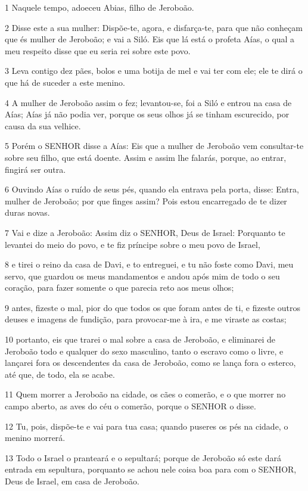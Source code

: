 \par 1 Naquele tempo, adoeceu Abias, filho de Jeroboão.
\par 2 Disse este a sua mulher: Dispõe-te, agora, e disfarça-te, para que não conheçam que és mulher de Jeroboão; e vai a Siló. Eis que lá está o profeta Aías, o qual a meu respeito disse que eu seria rei sobre este povo.
\par 3 Leva contigo dez pães, bolos e uma botija de mel e vai ter com ele; ele te dirá o que há de suceder a este menino.
\par 4 A mulher de Jeroboão assim o fez; levantou-se, foi a Siló e entrou na casa de Aías; Aías já não podia ver, porque os seus olhos já se tinham escurecido, por causa da sua velhice.
\par 5 Porém o SENHOR disse a Aías: Eis que a mulher de Jeroboão vem consultar-te sobre seu filho, que está doente. Assim e assim lhe falarás, porque, ao entrar, fingirá ser outra.
\par 6 Ouvindo Aías o ruído de seus pés, quando ela entrava pela porta, disse: Entra, mulher de Jeroboão; por que finges assim? Pois estou encarregado de te dizer duras novas.
\par 7 Vai e dize a Jeroboão: Assim diz o SENHOR, Deus de Israel: Porquanto te levantei do meio do povo, e te fiz príncipe sobre o meu povo de Israel,
\par 8 e tirei o reino da casa de Davi, e to entreguei, e tu não foste como Davi, meu servo, que guardou os meus mandamentos e andou após mim de todo o seu coração, para fazer somente o que parecia reto aos meus olhos;
\par 9 antes, fizeste o mal, pior do que todos os que foram antes de ti, e fizeste outros deuses e imagens de fundição, para provocar-me à ira, e me viraste as costas;
\par 10 portanto, eis que trarei o mal sobre a casa de Jeroboão, e eliminarei de Jeroboão todo e qualquer do sexo masculino, tanto o escravo como o livre, e lançarei fora os descendentes da casa de Jeroboão, como se lança fora o esterco, até que, de todo, ela se acabe.
\par 11 Quem morrer a Jeroboão na cidade, os cães o comerão, e o que morrer no campo aberto, as aves do céu o comerão, porque o SENHOR o disse.
\par 12 Tu, pois, dispõe-te e vai para tua casa; quando puseres os pés na cidade, o menino morrerá.
\par 13 Todo o Israel o pranteará e o sepultará; porque de Jeroboão só este dará entrada em sepultura, porquanto se achou nele coisa boa para com o SENHOR, Deus de Israel, em casa de Jeroboão.
